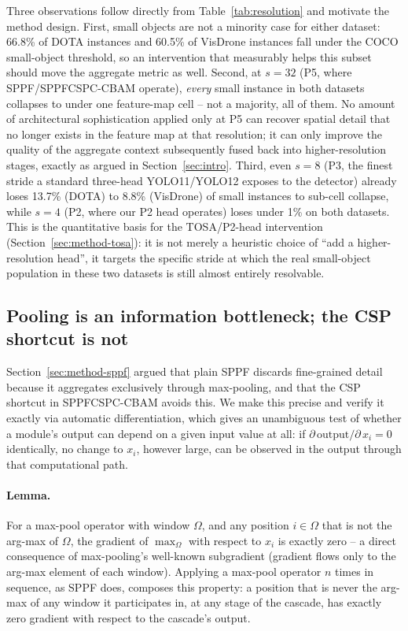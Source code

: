 \documentclass[conference]{IEEEtran}
\begin{document}
Three observations follow directly from Table~\ref{tab:resolution} and
motivate the method design. First, small objects are not a minority case
for either dataset: 66.8\% of DOTA instances and 60.5\% of VisDrone
instances fall under the COCO small-object threshold, so an intervention
that measurably helps this subset should move the aggregate metric as
well. Second, at $s{=}32$ (P5, where SPPF/SPPFCSPC-CBAM operate),
\emph{every} small instance in both datasets collapses to under one
feature-map cell -- not a majority, all of them. No amount of
architectural sophistication applied only at P5 can recover spatial
detail that no longer exists in the feature map at that resolution; it
can only improve the quality of the aggregate context subsequently fused
back into higher-resolution stages, exactly as argued in
Section~\ref{sec:intro}. Third, even $s{=}8$ (P3, the finest stride a
standard three-head YOLO11/YOLO12 exposes to the detector) already loses
13.7\% (DOTA) to 8.8\% (VisDrone) of small instances to sub-cell collapse,
while $s{=}4$ (P2, where our P2 head operates) loses under 1\% on both
datasets. This is the quantitative basis for the TOSA/P2-head
intervention (Section~\ref{sec:method-tosa}): it is not merely a
heuristic choice of ``add a higher-resolution head'', it targets the
specific stride at which the real small-object population in these two
datasets is still almost entirely resolvable.

\subsection{Pooling is an information bottleneck; the CSP shortcut is not}
\label{sec:theory-bottleneck}

Section~\ref{sec:method-sppf} argued that plain SPPF discards
fine-grained detail because it aggregates exclusively through max-pooling,
and that the CSP shortcut in SPPFCSPC-CBAM avoids this. We make this
precise and verify it exactly via automatic differentiation, which gives
an unambiguous test of whether a module's output can depend on a given
input value at all: if $\partial\,\mathrm{output}/\partial\,x_{i} = 0$
identically, no change to $x_i$, however large, can be observed in the
output through that computational path.

\paragraph{Lemma.} For a max-pool operator with window $\Omega$, and any
position $i \in \Omega$ that is not the arg-max of $\Omega$, the gradient
of $\max_{\Omega}$ with respect to $x_i$ is exactly zero -- a direct
consequence of max-pooling's well-known subgradient (gradient flows only
to the arg-max element of each window). Applying a max-pool operator $n$
times in sequence, as SPPF does, composes this property: a position that
is never the arg-max of any window it participates in, at any stage of
the cascade, has exactly zero gradient with respect to the cascade's
output.
\end{document}
